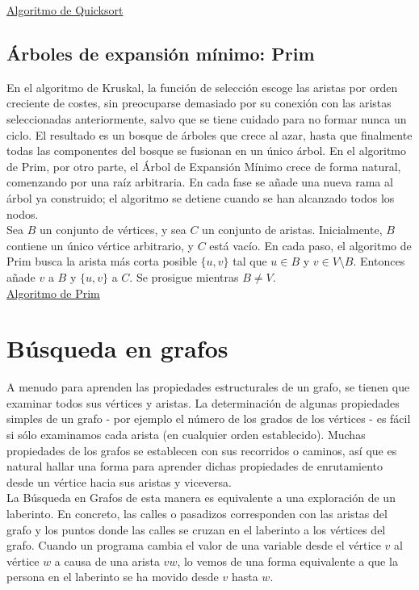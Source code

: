 \pagebreak
\underline{Algoritmo de Quicksort}\\


\subsection{Árboles de expansión mínimo: Prim}

En el algoritmo de Kruskal, la función de selección escoge las aristas por orden creciente de costes, sin preocuparse demasiado por su conexión con las aristas seleccionadas anteriormente, salvo que se tiene cuidado para no formar nunca un ciclo. El resultado es un bosque de árboles que crece al azar, hasta que finalmente todas las componentes del bosque se fusionan en un único árbol. En el algoritmo de Prim, por otro parte, el Árbol de Expansión Mínimo crece de forma natural, comenzando por una raíz arbitraria. En cada fase se añade una nueva rama al árbol ya construido; el algoritmo se detiene cuando se han alcanzado todos los nodos.\\

Sea $B$ un conjunto de vértices, y sea $C$ un conjunto de aristas. Inicialmente, $B$ contiene un único vértice arbitrario, y $C$ está vacío. En cada paso, el algoritmo de Prim busca la arista más corta posible $\{u,v\}$ tal que $u \in B$ y $v \in V \setminus B$. Entonces añade $v$ a $B$ y $\{u,v\}$ a $C$. Se prosigue mientras $B \ne V$.\\

\underline{Algoritmo de Prim}\\



\section{Búsqueda en grafos}

A menudo para aprenden las propiedades estructurales de un grafo, se tienen que examinar todos sus vértices y aristas. La determinación de algunas propiedades simples de un grafo - por ejemplo el número de los grados de los vértices - es fácil si sólo examinamos cada arista (en cualquier orden establecido). Muchas propiedades de los grafos se establecen con sus recorridos o caminos, así que es natural hallar una forma para aprender dichas propiedades de enrutamiento desde un vértice hacia sus aristas y viceversa.\\

La Búsqueda en Grafos de esta manera es equivalente a una exploración de un laberinto. En concreto, las calles o pasadizos corresponden con las aristas del grafo y los puntos donde las calles se cruzan en el laberinto a los vértices del grafo. Cuando un programa cambia el valor de una variable desde el vértice $v$ al vértice $w$ a causa de una arista $vw$, lo vemos de una forma equivalente a que la persona en el laberinto se ha movido desde $v$ hasta $w$.\\


